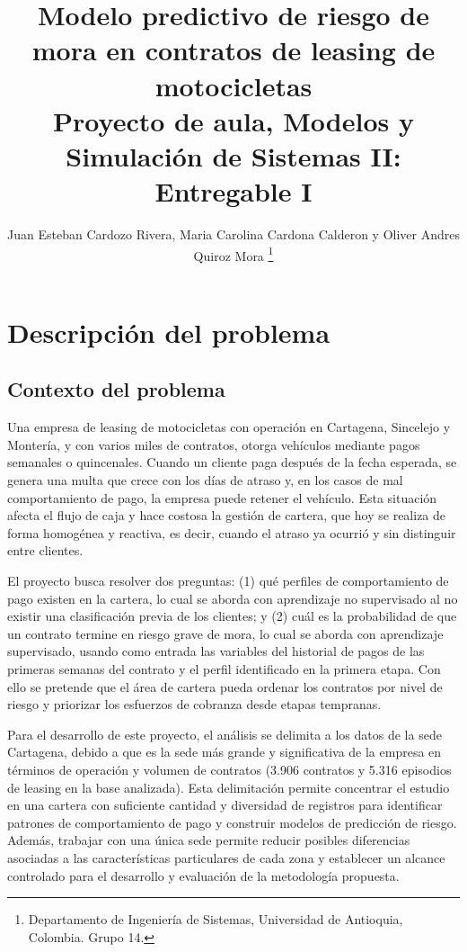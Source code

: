 \documentclass[journal]{IEEEtran}
\begin{document}
\title{Modelo predictivo de riesgo de mora en contratos de leasing de motocicletas\\
\large Proyecto de aula, Modelos y Simulación de Sistemas II: Entregable I}

\author{Juan Esteban Cardozo Rivera, Maria Carolina Cardona Calderon y Oliver Andres Quiroz Mora%
\thanks{Departamento de Ingeniería de Sistemas, Universidad de Antioquia, Colombia. Grupo 14.}}

\maketitle

\section{Descripción del problema}

\subsection{Contexto del problema}
\label{sec:contexto}

Una empresa de leasing de motocicletas con operación en Cartagena, Sincelejo y Montería, y con varios miles de contratos, otorga vehículos mediante pagos semanales o quincenales. Cuando un cliente paga después de la fecha esperada, se genera una multa que crece con los días de atraso y, en los casos de mal comportamiento de pago, la empresa puede retener el vehículo. Esta situación afecta el flujo de caja y hace costosa la gestión de cartera, que hoy se realiza de forma homogénea y reactiva, es decir, cuando el atraso ya ocurrió y sin distinguir entre clientes.

El proyecto busca resolver dos preguntas: (1) qué perfiles de comportamiento de pago existen en la cartera, lo cual se aborda con aprendizaje no supervisado al no existir una clasificación previa de los clientes; y (2) cuál es la probabilidad de que un contrato termine en riesgo grave de mora, lo cual se aborda con aprendizaje supervisado, usando como entrada las variables del historial de pagos de las primeras semanas del contrato y el perfil identificado en la primera etapa. Con ello se pretende que el área de cartera pueda ordenar los contratos por nivel de riesgo y priorizar los esfuerzos de cobranza desde etapas tempranas.

Para el desarrollo de este proyecto, el análisis se delimita a los datos de la sede Cartagena, debido a que es la sede más grande y significativa de la empresa en términos de operación y volumen de contratos (3.906 contratos y 5.316 episodios de leasing en la base analizada). Esta delimitación permite concentrar el estudio en una cartera con suficiente cantidad y diversidad de registros para identificar patrones de comportamiento de pago y construir modelos de predicción de riesgo. Además, trabajar con una única sede permite reducir posibles diferencias asociadas a las características particulares de cada zona y establecer un alcance controlado para el desarrollo y evaluación de la metodología propuesta.
\end{document}
